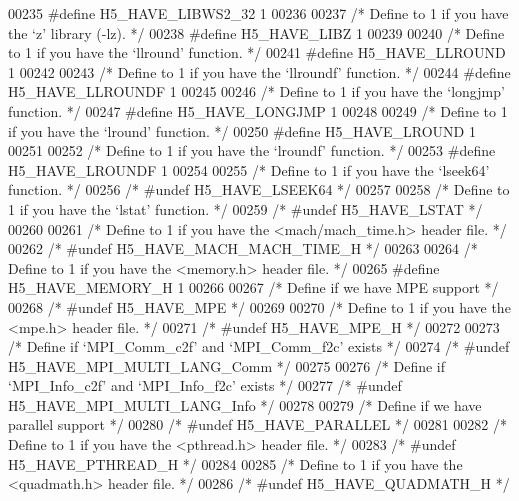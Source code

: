 \begin{DoxyCode}
{00235 \textcolor{preprocessor}{#define H5\_HAVE\_LIBWS2\_32 1}
00236 
00237 \textcolor{comment}{/* Define to 1 if you have the `z' library (-lz). */}
00238 \textcolor{preprocessor}{#define H5\_HAVE\_LIBZ 1}
00239 
00240 \textcolor{comment}{/* Define to 1 if you have the `llround' function. */}
00241 \textcolor{preprocessor}{#define H5\_HAVE\_LLROUND 1}
00242 
00243 \textcolor{comment}{/* Define to 1 if you have the `llroundf' function. */}
00244 \textcolor{preprocessor}{#define H5\_HAVE\_LLROUNDF 1}
00245 
00246 \textcolor{comment}{/* Define to 1 if you have the `longjmp' function. */}
00247 \textcolor{preprocessor}{#define H5\_HAVE\_LONGJMP 1}
00248 
00249 \textcolor{comment}{/* Define to 1 if you have the `lround' function. */}
00250 \textcolor{preprocessor}{#define H5\_HAVE\_LROUND 1}
00251 
00252 \textcolor{comment}{/* Define to 1 if you have the `lroundf' function. */}
00253 \textcolor{preprocessor}{#define H5\_HAVE\_LROUNDF 1}
00254 
00255 \textcolor{comment}{/* Define to 1 if you have the `lseek64' function. */}
00256 \textcolor{comment}{/* #undef H5\_HAVE\_LSEEK64 */}
00257 
00258 \textcolor{comment}{/* Define to 1 if you have the `lstat' function. */}
00259 \textcolor{comment}{/* #undef H5\_HAVE\_LSTAT */}
00260 
00261 \textcolor{comment}{/* Define to 1 if you have the <mach/mach\_time.h> header file. */}
00262 \textcolor{comment}{/* #undef H5\_HAVE\_MACH\_MACH\_TIME\_H */}
00263 
00264 \textcolor{comment}{/* Define to 1 if you have the <memory.h> header file. */}
00265 \textcolor{preprocessor}{#define H5\_HAVE\_MEMORY\_H 1}
00266 
00267 \textcolor{comment}{/* Define if we have MPE support */}
00268 \textcolor{comment}{/* #undef H5\_HAVE\_MPE */}
00269 
00270 \textcolor{comment}{/* Define to 1 if you have the <mpe.h> header file. */}
00271 \textcolor{comment}{/* #undef H5\_HAVE\_MPE\_H */}
00272 
00273 \textcolor{comment}{/* Define if `MPI\_Comm\_c2f' and `MPI\_Comm\_f2c' exists */}
00274 \textcolor{comment}{/* #undef H5\_HAVE\_MPI\_MULTI\_LANG\_Comm */}
00275 
00276 \textcolor{comment}{/* Define if `MPI\_Info\_c2f' and `MPI\_Info\_f2c' exists */}
00277 \textcolor{comment}{/* #undef H5\_HAVE\_MPI\_MULTI\_LANG\_Info */}
00278 
00279 \textcolor{comment}{/* Define if we have parallel support */}
00280 \textcolor{comment}{/* #undef H5\_HAVE\_PARALLEL */}
00281 
00282 \textcolor{comment}{/* Define to 1 if you have the <pthread.h> header file. */}
00283 \textcolor{comment}{/* #undef H5\_HAVE\_PTHREAD\_H */}
00284 
00285 \textcolor{comment}{/* Define to 1 if you have the <quadmath.h> header file. */}
00286 \textcolor{comment}{/* #undef H5\_HAVE\_QUADMATH\_H */}
}
\end{DoxyCode}
